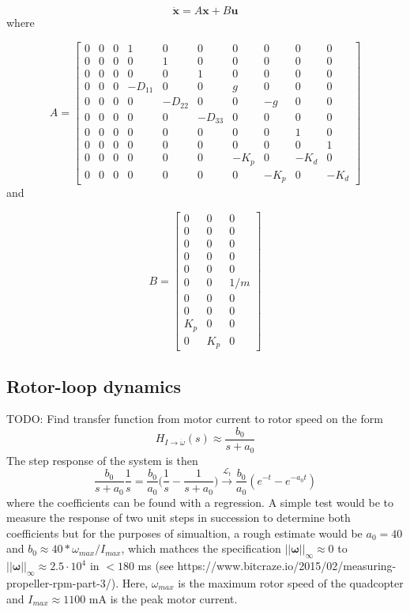 \documentclass{article}
\begin{document}
$$\dot{\mathbf{x}} = A \mathbf{x} + B \mathbf{u}$$
where

\begin{equation}
\label{eq:MPClinsystemA}
A = \begin{bmatrix}
0 & 0 & 0 & 1 & 0 & 0 & 0 & 0 & 0 & 0\\
0 & 0 & 0 & 0 & 1 & 0 & 0 & 0 & 0 & 0\\
0 & 0 & 0 & 0 & 0 & 1 & 0 & 0 & 0 & 0\\
0 & 0 & 0 & -D_{11} & 0 & 0 & g & 0 & 0 & 0\\
0 & 0 & 0 & 0 & -D_{22} & 0 & 0 & -g & 0 & 0\\
0 & 0 & 0 & 0 & 0 & -D_{33} & 0 & 0 & 0 & 0\\
0 & 0 & 0 & 0 & 0 & 0 & 0 & 0 & 1 & 0\\
0 & 0 & 0 & 0 & 0 & 0 & 0 & 0 & 0 & 1\\
0 & 0 & 0 & 0 & 0 & 0 & -K_p & 0 & -K_d & 0\\
0 & 0 & 0 & 0 & 0 & 0 & 0 & -K_p & 0 & -K_d
\end{bmatrix}
\end{equation}
and

\begin{equation}
\label{eq:MPClinsystemA}
B = \begin{bmatrix}
0 & 0 & 0\\
0 & 0 & 0\\
0 & 0 & 0\\
0 & 0 & 0\\
0 & 0 & 0\\
0 & 0 & 1/m\\
0 & 0 & 0\\
0 & 0 & 0\\
K_p & 0 & 0\\
0 & K_p & 0
\end{bmatrix}
\end{equation}

\subsection{Rotor-loop dynamics}
TODO: Find transfer function from motor current to rotor speed on the form
\begin{equation}
H_{I\rightarrow \dot{\omega}}(s) \approx \frac{b_0}{s + a_0}
\end{equation}
The step response of the system is then
\begin{equation}
\frac{b_0}{s + a_0} \frac{1}{s} = \frac{b_0}{a_0}\Big(\frac{1}{s} - \frac{1}{s + a_0}\Big) \overset{\mathcal{L}_t}{\longrightarrow}
\frac{b_0}{a_0}(e^{-t} - e^{-a_0t})
\end{equation}
where the coefficients can be found with a regression. A simple test would be to measure the response of two unit steps in succession to determine both coefficients but for the purposes of simualtion, a rough estimate would be $a_0=40$ and $b_0 \approx 40*\omega_{max}/I_{max}$, which mathces the specification $||{\boldsymbol\omega}||_{\infty} \approx 0$ to $||{\boldsymbol\omega}||_{\infty} \approx 2.5\cdot 10^4$ in $< 180$ ms (see https://www.bitcraze.io/2015/02/measuring-propeller-rpm-part-3/). Here, $\omega_{max}$ is the maximum rotor speed of the quadcopter and $I_{max}\approx 1100$ mA is the peak motor current.
\end{document}
